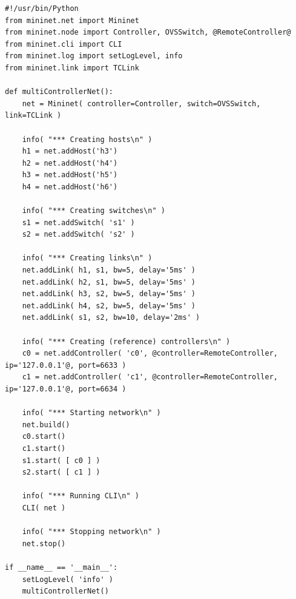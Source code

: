 \begin{minipage}{\linewidth}
\begin{lstlisting}
#!/usr/bin/Python
from mininet.net import Mininet
from mininet.node import Controller, OVSSwitch, @RemoteController@
from mininet.cli import CLI
from mininet.log import setLogLevel, info
from mininet.link import TCLink

def multiControllerNet():
    net = Mininet( controller=Controller, switch=OVSSwitch, link=TCLink )

    info( "*** Creating hosts\n" )
    h1 = net.addHost('h3')
    h2 = net.addHost('h4')
    h3 = net.addHost('h5')
    h4 = net.addHost('h6')

    info( "*** Creating switches\n" )
    s1 = net.addSwitch( 's1' )
    s2 = net.addSwitch( 's2' )

    info( "*** Creating links\n" )
    net.addLink( h1, s1, bw=5, delay='5ms' )
    net.addLink( h2, s1, bw=5, delay='5ms' )
    net.addLink( h3, s2, bw=5, delay='5ms' )
    net.addLink( h4, s2, bw=5, delay='5ms' )
    net.addLink( s1, s2, bw=10, delay='2ms' )

    info( "*** Creating (reference) controllers\n" )
    c0 = net.addController( 'c0', @controller=RemoteController, ip='127.0.0.1'@, port=6633 )
    c1 = net.addController( 'c1', @controller=RemoteController, ip='127.0.0.1'@, port=6634 )

    info( "*** Starting network\n" )
    net.build()
    c0.start()
    c1.start()
    s1.start( [ c0 ] )
    s2.start( [ c1 ] )

    info( "*** Running CLI\n" )
    CLI( net )

    info( "*** Stopping network\n" )
    net.stop()

if __name__ == '__main__':
    setLogLevel( 'info' )
    multiControllerNet()
\end{lstlisting}
\end{minipage}

